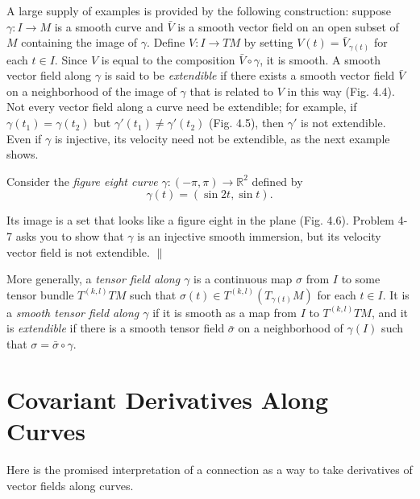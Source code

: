 A large supply of examples is provided by the following construction: suppose $\gamma: I \to M$ is a smooth curve and $\bar{V}$ is a smooth vector field on an open subset of $M$ containing the image of $\gamma$. Define $V: I \to TM$ by setting $V(t) = \bar{V}_{\gamma(t)}$ for each $t \in I$. Since $V$ is equal to the composition $\bar{V} \circ \gamma$, it is smooth. A smooth vector field along $\gamma$ is said to be \emph{extendible} if there exists a smooth vector field $\bar{V}$ on a neighborhood of the image of $\gamma$ that is related to $V$ in this way (Fig. 4.4). Not every vector field along a curve need be extendible; for example, if $\gamma(t_1) = \gamma(t_2)$ but $\gamma'(t_1) \ne \gamma'(t_2)$ (Fig. 4.5), then $\gamma'$ is not extendible. Even if $\gamma$ is injective, its velocity need not be extendible, as the next example shows.

\begin{example}
\label{ex:figure-eight-curve}
Consider the \emph{figure eight curve} $\gamma: (-\pi, \pi) \to \mathbb{R}^2$ defined by
\[
\gamma(t) = (\sin 2t, \sin t).
\]


Its image is a set that looks like a figure eight in the plane (Fig. 4.6). Problem 4-7 asks you to show that $\gamma$ is an injective smooth immersion, but its velocity vector field is not extendible. \hfill $\parallel$
\end{example}

More generally, a \emph{tensor field along $\gamma$} is a continuous map $\sigma$ from $I$ to some tensor bundle $T^{(k,l)} TM$ such that $\sigma(t) \in T^{(k,l)}(T_{\gamma(t)} M)$ for each $t \in I$. It is a \emph{smooth tensor field along $\gamma$} if it is smooth as a map from $I$ to $T^{(k,l)} TM$, and it is \emph{extendible} if there is a smooth tensor field $\bar{\sigma}$ on a neighborhood of $\gamma(I)$ such that $\sigma = \bar{\sigma} \circ \gamma$.

\section{Covariant Derivatives Along Curves}

Here is the promised interpretation of a connection as a way to take derivatives of vector fields along curves.

